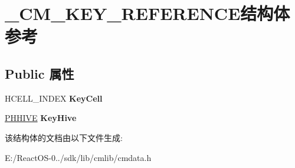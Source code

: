 \hypertarget{struct___c_m___k_e_y___r_e_f_e_r_e_n_c_e}{}\section{\+\_\+\+C\+M\+\_\+\+K\+E\+Y\+\_\+\+R\+E\+F\+E\+R\+E\+N\+C\+E结构体 参考}
\label{struct___c_m___k_e_y___r_e_f_e_r_e_n_c_e}
\subsection*{Public 属性}
\begin{DoxyCompactItemize}
\item 
\mbox{\label{struct___c_m___k_e_y___r_e_f_e_r_e_n_c_e_ad858e5e37f9eeba834189ad32d398bc3}} 
H\+C\+E\+L\+L\+\_\+\+I\+N\+D\+EX {\bfseries Key\+Cell}
\item 
\mbox{\label{struct___c_m___k_e_y___r_e_f_e_r_e_n_c_e_a18560e59db8297b99e32835099de4573}} 
\hyperlink{struct___h_h_i_v_e}{P\+H\+H\+I\+VE} {\bfseries Key\+Hive}
\end{DoxyCompactItemize}


该结构体的文档由以下文件生成\+:\begin{DoxyCompactItemize}
\item 
E\+:/\+React\+O\+S-\/0../sdk/lib/cmlib/cmdata.\+h\end{DoxyCompactItemize}
